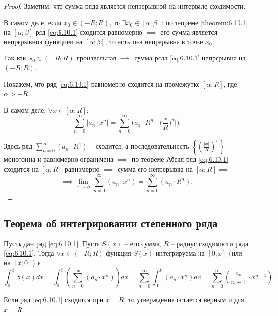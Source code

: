 \begin{proof}
    Заметим, что сумма ряда является непрерывной на интервале сходимости.

    В самом деле, если $x_0 \in (-R;R)$, то $\exists x_0 \in [\alpha;\beta]$: по теореме \ref{theorem:6.10.1} на $[\alpha;\beta]$ ряд \ref{eq:6.10.1} сходится равномерно $\implies$ его сумма является непрерывной функцией на $[\alpha;\beta]$, то есть она непрерывна в точке $x_0$.

    Так как $x_0 \in (-R;R)$ произвольная $\implies$ сумма ряда \ref{eq:6.10.1} непрерывна на $(-R;R)$.

    Покажем, что ряд \ref{eq:6.10.1} равномерно сходится на промежутке $[\alpha;R]$, где $\alpha > - R$.

    В самом деле, $\forall x \in [\alpha;R]$:
    \[
        \sum_{n=0}^{\infty}|a_n \cdot x^n| = \sum_{n=0}^{\infty}\bigg(a_n \cdot R^n \cdot \bigg|\bigg(\frac{x}{R}\bigg)^n\bigg|\bigg).
    \]

    Здесь ряд $\sum_{n=0}^{\infty}(a_n \cdot R^n)$ -- сходится, а последовательность $\left\{\left(\frac{|x|}{R}\right)^n\right\}$ монотонна и равномерно ограничена $\implies$ по теореме Абеля ряд \ref{eq:6.10.1} сходится на $[\alpha;R]$ равномерно $\implies$ сумма его непрерывна на $[\alpha;R] \implies$
    \[
        \implies\underset{x\rightarrow R}{\lim}\sum_{n=0}^{\infty}(a_n \cdot x^n) = \sum_{n=0}^{\infty} (a_n \cdot R^n).
    \]
\end{proof}

\subsection{Теорема об интегрировании степенного ряда}

\begin{theorem}
    Пусть дан ряд \ref{eq:6.10.1}. Пусть $S(x)$ -- его сумма, $R$ -- радиус сходимости ряда \ref{eq:6.10.1}. Тогда $\forall \overline{x} \in (-R;R)$ функция $S(x)$ интегрируема на $[0;\overline{x}]$ (или на $[\overline{x};0]$) и
    \[
        \int_{0}^{\overline{x}}S(x)dx = \int_{0}^{\overline{x}}\left(\sum_{n=0}^{\infty}(a_n \cdot x^n)\right)dx = \sum_{n=0}^{\infty}\int_{0}^{\overline{x}}(a_n \cdot x^n)dx = \sum_{n=0}^{\infty} \left(\frac{a_n}{n+1}\cdot \overline{x}^{n+1}\right).
    \]

    Если ряд \ref{eq:6.10.1} сходится при $x = R$, то утверждение остается верным и для $\overline{x} = R$.
\end{theorem}

